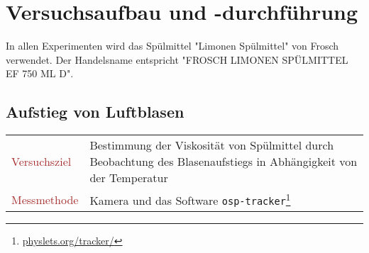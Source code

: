 \newcommand*{\tou}[1]{\textcolor{Brown}{#1}}

\section{Versuchsaufbau und -durchführung}
	In allen Experimenten wird das Spülmittel "Limonen Spülmittel" von Frosch verwendet. Der Handelsname entspricht "FROSCH LIMONEN SPÜLMITTEL EF 750 ML D".
	\subsection{Aufstieg von Luftblasen}
		\begin{tabularx}{\textwidth}{l X}
			\tou{Versuchsziel} & Bestimmung der Viskosität von Spülmittel durch Beobachtung des Blasenaufstiegs in Abhängigkeit von der Temperatur \\
			\tou{Messmethode} & Kamera und das Software \texttt{osp-tracker}\footnote{\url{physlets.org/tracker/}}
		\end{tabularx}
